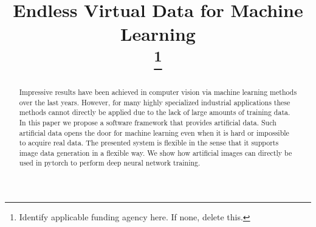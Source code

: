 \documentclass[conference]{IEEEtran}
\begin{document}
\title{Endless Virtual Data for Machine Learning\\
\thanks{Identify applicable funding agency here. If none, delete this.}
}

\author{
\and
{}
\and
{}
\and
{}
\and
{}
\and
{}
}

\maketitle

\begin{abstract}
Impressive results have been achieved in computer vision via machine learning methods over the last years. However, for many highly specialized industrial applications these methods cannot directly be applied due to the lack of large amounts of training data. In this paper we propose a software framework that provides artificial data. Such artificial data opens the door for machine learning even when it is hard or impossible to acquire real data. The presented system is flexible in the sense that it supports image data generation in a flexible way. We show how artificial images can directly be used in pytorch to perform deep neural network training. 
\end{abstract}
\end{document}
